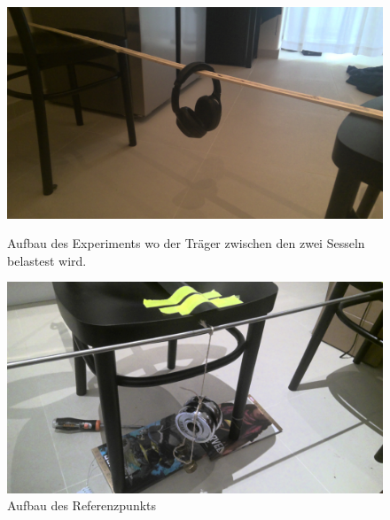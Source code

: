 \documentclass[11pt,ngerman]{scrartcl}
\begin{document}
\begin{figure}[H]
	\centering
	\begin{minipage}[htbp]{\linewidth}
		\begin{minipage}[htbp]{.45\linewidth} %
			\includegraphics[width=\linewidth]{pics/aufbau1.jpg}
			\caption[Aufbau des Experiments]{Aufbau des Experiments wo der Träger
				zwischen den zwei Sesseln belastest wird.}
			\label{fig:aufbau}
		\end{minipage}
		\begin{minipage}[htbp]{.50\linewidth} %
			\includegraphics[width=\linewidth]{pics/aufbau2.jpg}
			\caption[Aufbau des Experiments Schuhlöffel]{Aufbau des Referenzpunkts}
			\label{fig:schuhloffel}
		\end{minipage}
	\end{minipage}
\end{figure}
\end{document}

